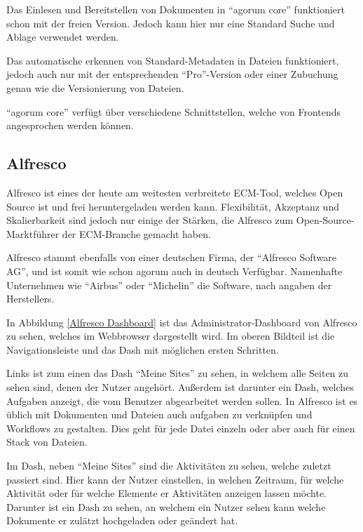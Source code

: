Das Einlesen und Bereitstellen von Dokumenten in "`agorum core"' funktioniert schon mit der freien Version. Jedoch kann hier nur eine Standard Suche und Ablage verwendet werden. \cite{agorum_preise}

Das automatische erkennen von Standard-Metadaten in Dateien funktioniert, jedoch auch nur mit der entsprechenden "`Pro"'-Version oder einer Zubuchung genau wie die Versionierung von Dateien.

"`agorum core"' verf\"ugt \"uber verschiedene Schnittstellen, welche von Frontends angesprochen werden k\"onnen. 

\subsection{Alfresco}
Alfresco ist eines der heute am weitesten verbreitete \ac{ECM}-Tool, welches Open Source ist und frei heruntergeladen werden kann.
Flexibilit\"at, Akzeptanz und Skalierbarkeit sind jedoch nur einige der St\"arken, die Alfresco zum Open-Source-Marktf\"uhrer der \ac{ECM}-Branche gemacht haben. \cite{Alfresco_und_Liferay} \cite{Wiki_Alfresco} \cite{Alfresco_Implementation}

Alfresco stammt ebenfalls von einer deutschen Firma, der "`Alfresco Software AG"', und ist somit wie schon agorum auch in deutsch Verf\"ugbar. Namenhafte Unternehmen wie "`Airbus"' oder "`Michelin"' die Software, nach angaben der Herstellers. \cite{Alfresco_Website}

In Abbildung \ref{Alfresco Dashboard} ist das Administrator-Dashboard von Alfresco zu sehen, welches im Webbrowser dargestellt wird.
Im oberen Bildteil ist die Navigationsleiste und das Dash mit m\"oglichen ersten Schritten.

Links ist zum einen das Dash "`Meine Sites"' zu sehen, in welchem alle Seiten zu sehen sind, denen der Nutzer angeh\"ort. Au\ss{}erdem ist darunter ein Dash, welches Aufgaben anzeigt, die vom Benutzer abgearbeitet werden sollen. In Alfresco ist es \"ublich mit Dokumenten und Dateien auch aufgaben zu verkn\"upfen und Workflows zu gestalten. Dies geht f\"ur jede Datei einzeln oder aber auch f\"ur einen Stack von Dateien.

Im Dash, neben "`Meine Sites"' sind die Aktivit\"aten zu sehen, welche zuletzt passiert sind. Hier kann der Nutzer einstellen, in welchen Zeitraum, f\"ur welche Aktivit\"at oder f\"ur welche Elemente er Aktivit\"aten anzeigen lassen m\"ochte.
Darunter ist ein Dash zu sehen, an welchem ein Nutzer sehen kann welche Dokumente er zul\"atzt hochgeladen oder ge\"andert hat.

